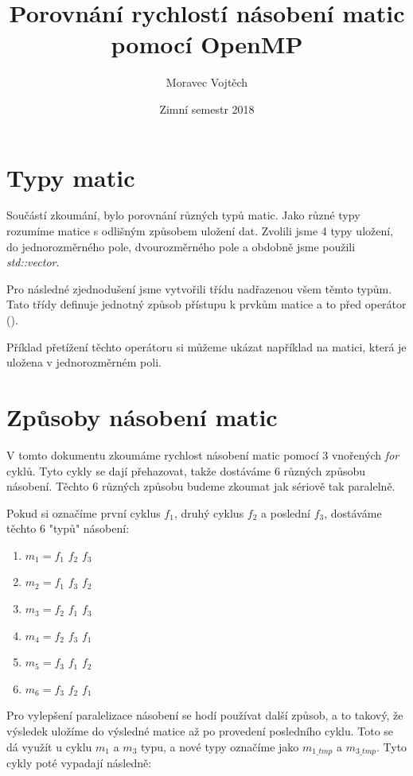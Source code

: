 \documentclass[a4paper, 12pt]{article}
\title{Porovnání rychlostí násobení matic pomocí OpenMP}
\author{Moravec Vojtěch}
\date{Zimní semestr 2018}
\begin{document}
\maketitle
\newpage

\tableofcontents
\newpage

\section{Typy matic}
Součástí zkoumání, bylo porovnání různých typů matic. Jako různé typy rozumíme matice s odlišným způsobem uložení dat. Zvolili jsme 4 typy uložení, do jednorozměrného pole, dvourozměrného pole a obdobně jsme použili \emph{std::vector}.


Pro následné zjednodušení jsme vytvořili třídu nadřazenou všem těmto typům. Tato třídy definuje jednotný způsob přístupu k prvkům matice a to před operátor ().



Příklad přetížení těchto operátoru si můžeme ukázat například na matici, která je uložena v jednorozměrném poli.



\newpage
\section{Způsoby násobení matic}
V tomto dokumentu zkoumáme rychlost násobení matic pomocí 3 vnořených \emph{for} cyklů. Tyto cykly se dají přehazovat, takže dostáváme 6 různých způsobu násobení. Těchto 6 různých způsobu budeme zkoumat jak sériově tak paralelně.



Pokud si označíme první cyklus $f_1$, druhý cyklus $f_2$ a poslední $f_3$, dostáváme těchto 6 "typů"   násobení:
\begin{enumerate}
\item $m_1 = f_1$ $f_2$ $f_3$
\item $m_2 = f_1$ $f_3$ $f_2$
\item $m_3 = f_2$ $f_1$ $f_3$
\item $m_4 = f_2$ $f_3$ $f_1$
\item $m_5 = f_3$ $f_1$ $f_2$
\item $m_6 = f_3$ $f_2$ $f_1$
\end{enumerate}

\newpage

Pro vylepšení paralelizace násobení se hodí používat další způsob, a to takový, že výsledek uložíme do výsledné matice až po provedení posledního cyklu. Toto se dá využít u cyklu $m_1$ a $m_3$ typu, a nové typy označíme jako 
$m_{1\_tmp}$ a $m_{3\_tmp}$. Tyto cykly poté vypadají následně:
\end{document}
